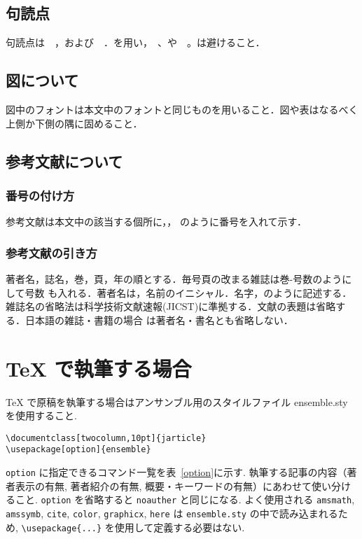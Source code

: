 \documentclass[twocolumn,10pt]{jarticle}
\begin{document}
\subsection{句読点}
句読点は　，および　．を用い，　、や　。は避けること．
\\

\subsection{図について}
図中のフォントは本文中のフォントと同じものを用いること．図や表はなるべく上側か下側の隅に固めること．
\\

\subsection{参考文献について}
\subsubsection{番号の付け方}
参考文献は本文中の該当する個所に\cite{ueda}，\cite{ueda,metropolis}，
\cite{ueda,alder,metropolis,allen}のように番号を入れて示す．
\\

\subsubsection{参考文献の引き方}
著者名，誌名，巻，頁，年の順とする．毎号頁の改まる雑誌は巻-号数のようにして号数
も入れる．著者名は，名前のイニシャル．名字，のように記述する．雑誌名の省略法は科学技術文献速報(JICST)に準拠する．文献の表題は省略する．日本語の雑誌・書籍の場合
は著者名・書名とも省略しない．
\\

\section{TeX で執筆する場合}
TeX で原稿を執筆する場合はアンサンブル用のスタイルファイル ensemble.sty を使用すること.  
\begin{verbatim}
\documentclass[twocolumn,10pt]{jarticle}
\usepackage[option]{ensemble}	
\end{verbatim}
\verb|option| に指定できるコマンド一覧を表~\ref{option}に示す.
執筆する記事の内容（著者表示の有無, 著者紹介の有無, 概要・キーワードの有無）にあわせて使い分けること.
\verb|option| を省略すると \verb|noauther| と同じになる.
よく使用される \verb|amsmath|, \verb|amssymb|, \verb|cite|, \verb|color|, \verb|graphicx|, \verb|here|  は \verb|ensemble.sty| の中で読み込まれるため, \verb|\usepackage{...}| を使用して定義する必要はない.
\end{document}
